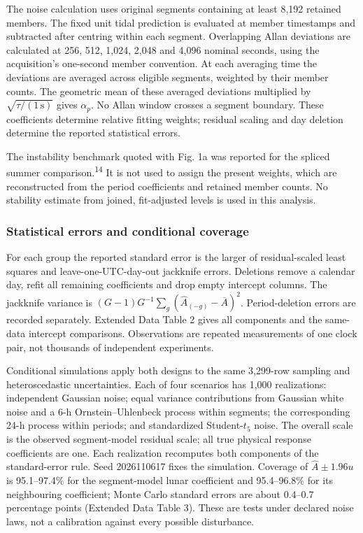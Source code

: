 \documentclass[
  12pt,
  a4paper,
]{article}
\begin{document}
The noise calculation uses original segments containing at least 8,192
retained members. The fixed unit tidal prediction is evaluated at member
timestamps and subtracted after centring within each segment.
Overlapping Allan deviations are calculated at 256, 512, 1,024, 2,048
and 4,096 nominal seconds, using the acquisition's one-second member
convention. At each averaging time the deviations are averaged across
eligible segments, weighted by their member counts. The geometric mean
of these averaged deviations multiplied by
\(\sqrt{\tau/(1\,\mathrm{s})}\) gives \(\alpha_p\). No Allan window
crosses a segment boundary. These coefficients determine relative
fitting weights; residual scaling and day deletion determine the
reported statistical errors.

The instability benchmark quoted with Fig. 1a was reported for the
spliced summer comparison.\textsuperscript{14} It is not used to assign
the present weights, which are reconstructed from the period
coefficients and retained member counts. No stability estimate from
joined, fit-adjusted levels is used in this analysis.

\hypertarget{statistical-errors-and-conditional-coverage}{%
\subsubsection{Statistical errors and conditional
coverage}\label{statistical-errors-and-conditional-coverage}}

For each group the reported standard error is the larger of
residual-scaled least squares and leave-one-UTC-day-out jackknife
errors. Deletions remove a calendar day, refit all remaining
coefficients and drop empty intercept columns. The jackknife variance is
\((G-1)G^{-1}\sum_g(\hat A_{(-g)}-\overline A)^2\). Period-deletion
errors are recorded separately. Extended Data Table 2 gives all
components and the same-data intercept comparisons. Observations are
repeated measurements of one clock pair, not thousands of independent
experiments.

Conditional simulations apply both designs to the same 3,299-row
sampling and heteroscedastic uncertainties. Each of four scenarios has
1,000 realizations: independent Gaussian noise; equal variance
contributions from Gaussian white noise and a 6-h Ornstein--Uhlenbeck
process within segments; the corresponding 24-h process within periods;
and standardized Student-\(t_5\) noise. The overall scale is the
observed segment-model residual scale; all true physical response
coefficients are one. Each realization recomputes both components of the
standard-error rule. Seed 2026110617 fixes the simulation. Coverage of
\(\hat A\pm1.96u\) is 95.1--97.4\% for the segment-model lunar
coefficient and 95.4--96.8\% for its neighbouring coefficient; Monte
Carlo standard errors are about 0.4--0.7 percentage points (Extended
Data Table 3). These are tests under declared noise laws, not a
calibration against every possible disturbance.
\end{document}
